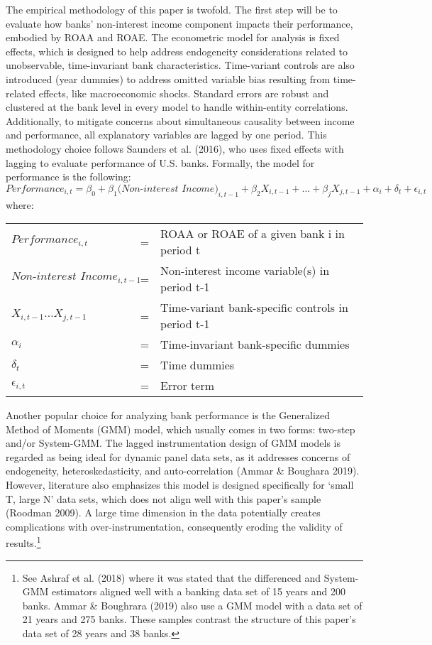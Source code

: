 \documentclass[10pt]{article} %
\begin{document}
\par The empirical methodology of this paper is twofold. The first step will be to evaluate how banks' non-interest income component impacts their performance, embodied by ROAA and ROAE. The econometric model for analysis is fixed effects, which is designed to help address endogeneity considerations related to unobservable, time-invariant bank characteristics. Time-variant controls are also introduced (year dummies) to address omitted variable bias resulting from time-related effects, like macroeconomic shocks. Standard errors are robust and clustered at the bank level in every model to handle within-entity correlations. Additionally, to mitigate concerns about simultaneous causality between income and performance, all explanatory variables are lagged by one period. This methodology choice follows Saunders et al. (2016), who uses fixed effects with lagging to evaluate performance of U.S. banks. Formally, the model for performance is the following: 
\begin{equation}
    Performance_{i,t} = \beta_0 + \beta_1\textit{(Non-interest Income)}_{i,t-1} +
    \beta_2X_{i,t-1} + ... + \beta_jX_{j,t-1} + \alpha_i + \delta_t + \epsilon_{i,t}
\end{equation}
where: 
\begin{center}\begin{tabular}{lll}
$Performance_{i,t}$ & = & ROAA or ROAE of a given bank i in period t \\
$\textit{Non-interest Income}_{i,t-1}$ & = & Non-interest income variable(s) in period t-1 \\ 
$X_{i,t-1}...X_{j,t-1}$ & = & Time-variant bank-specific controls in period t-1 \\
$\alpha_i$ & = & Time-invariant bank-specific dummies \\ 
$\delta_t$ & = & Time dummies \\
$\epsilon_{i,t}$ & = & Error term
\end{tabular}\end{center}

\par Another popular choice for analyzing bank performance is the Generalized Method of Moments (GMM) model, which usually comes in two forms: two-step and/or System-GMM. The lagged instrumentation design of GMM models is regarded as being ideal for dynamic panel data sets, as it addresses concerns of endogeneity, heteroskedasticity, and auto-correlation (Ammar \& Boughara 2019). However, literature also emphasizes this model is designed specifically for `small T, large N' data sets, which does not align well with this paper's sample (Roodman 2009). A large time dimension in the data potentially creates complications with over-instrumentation, consequently eroding the validity of results.\footnote{See Ashraf et al. (2018) where it was stated that the differenced and System-GMM estimators aligned well with a banking data set of 15 years and 200 banks. Ammar \& Boughrara (2019) also use a GMM model with a data set of 21 years and 275 banks. These samples contrast the structure of this paper's data set of 28 years and 38 banks.}
\end{document}
